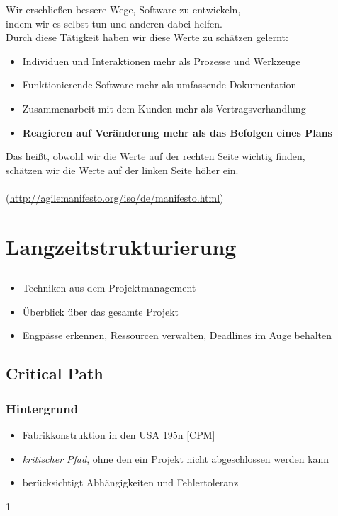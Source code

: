 \documentclass[%
	handout
]{beamer}
\newcommand{\cpm}{[CPM]}
\begin{document}
		\begin{frame}
			\begin{center}
				Wir erschließen bessere Wege, Software zu entwickeln,\\
				indem wir es selbst tun und anderen dabei helfen.\\
				Durch diese Tätigkeit haben wir diese Werte zu schätzen gelernt:\\
			\end{center}
			\pause
			\begin{itemize}
				\item Individuen und Interaktionen mehr als Prozesse und Werkzeuge
				\item Funktionierende Software mehr als umfassende Dokumentation
				\item Zusammenarbeit mit dem Kunden mehr als Vertragsverhandlung
				\item \textbf{Reagieren auf Veränderung mehr als das Befolgen eines Plans}
			\end{itemize}
			\pause
			\begin{center}
				Das heißt, obwohl wir die Werte auf der rechten Seite wichtig finden,\\
				schätzen wir die Werte auf der linken Seite höher ein.\-\\\-\\
				(\url{http://agilemanifesto.org/iso/de/manifesto.html})
			\end{center}
		\end{frame}
		
\section{Langzeitstrukturierung}
	\subsection{}
		\begin{frame}
			\begin{itemize}
				\item Techniken aus dem Projektmanagement\pause
				\item Überblick über das gesamte Projekt\pause
				\item Engpässe erkennen, Ressourcen verwalten, Deadlines im Auge behalten
			\end{itemize}
		\end{frame}
		
	\subsection{Critical Path}
		\begin{frame}
			\frametitle{Hintergrund}
			\begin{itemize}
				\item Fabrikkonstruktion in den USA 195n \cpm\pause
				\item \textit{kritischer Pfad}, ohne den ein Projekt nicht abgeschlossen werden kann\pause
				\item berücksichtigt Abhängigkeiten und Fehlertoleranz
			\end{itemize}
1		\end{frame}
		
\end{document}
